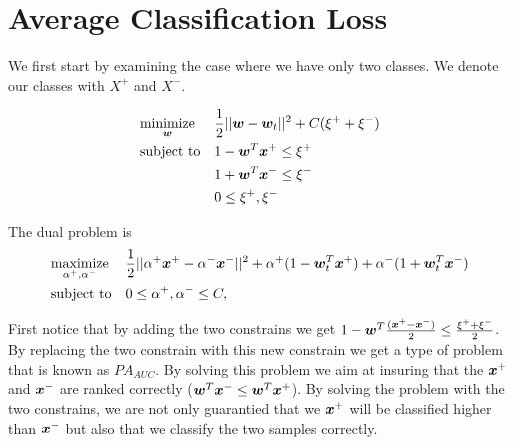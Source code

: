 \section{Average Classification Loss}

We first start by examining the case where we have only two classes. We denote our classes with $X^+$ and $X^-$.

\begin{equation*}
\begin{aligned}
& \underset{\bm{w}}{\text{minimize}}
& & \frac{1}{2} || \bm{w} - \bm{w}_t ||^2 + C ( \xi^+ + \xi^- ) \\
& \text{subject to}
& & 1 - \bm{w}^T \bm{x}^+ \leq \xi^+\\
& & & 1 + \bm{w}^T \bm{x}^-  \leq \xi^- \\
& & & 0 \leq \xi^+, \xi^-
\end{aligned}
\end{equation*}


The dual problem is 
\begin{equation*}
\begin{aligned}
& \underset{\alpha^+, \alpha^-}{\text{maximize}}
& & \frac{1}{2} || \alpha^+ \bm{x}^+ - \alpha^- \bm{x}^-||^2 + \alpha^+ (1 - \bm{w}_t^T \bm{x}^+ ) + \alpha^- (1 + \bm{w}_t^T \bm{x}^- )\\
& \text{subject to}
& & 0 \leq \alpha^+,\alpha^- \leq C, 
\end{aligned}
\end{equation*}


First notice that by adding the two constrains we get $1 - \bm{w}^T \frac{(\bm{x}^+ - \bm{x}^- )}{2} \leq \frac{\xi^+ + \xi^-}{2}$. By replacing the two constrain with this new constrain we get a type of problem that is known as $PA_{AUC}$. By solving this problem we aim at insuring that the $\bm{x}^+$ and $\bm{x}^-$ are ranked correctly ($ \bm{w}^T \bm{x}^- \leq \bm{w}^T \bm{x}^+ $).  By solving the problem with the two constrains, we are not only guarantied that we $\bm{x}^+$ will be classified higher than $\bm{x}^-$ but also that we classify the two samples correctly. 

